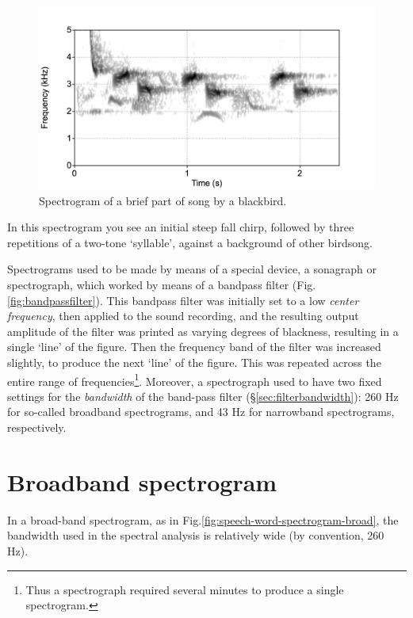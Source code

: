 \documentclass[
]{book}
\begin{document}
\begin{figure}

{\centering \includegraphics{figures/merel-spectrogram} 

}

\caption{Spectrogram of a brief part of song by a blackbird.}\label{fig:merel-spectrogram}
\end{figure}

In this spectrogram you see an initial steep fall chirp, followed by three repetitions of a two-tone `syllable', against a background of other birdsong.

Spectrograms used to be made by means of a special device, a sonagraph or spectrograph, which worked by means of a bandpass filter (Fig.\ref{fig:bandpassfilter}). This bandpass filter was initially set to a low \emph{center frequency}, then applied to the sound recording, and the resulting output amplitude of the filter was printed as varying degrees of blackness, resulting in a single `line' of the figure. Then the frequency band of the filter was increased slightly, to produce the next `line' of the figure. This was repeated across the entire range of frequencies\footnote{Thus a spectrograph required several minutes to produce a single spectrogram.}. Moreover, a spectrograph used to have two fixed settings for the \emph{bandwidth} of the band-pass filter (§\ref{sec:filterbandwidth}): 260 Hz for so-called broadband spectrograms, and 43 Hz for narrowband spectrograms, respectively.

\section{Broadband spectrogram}\label{broadband-spectrogram}

In a broad-band spectrogram, as in Fig.\ref{fig:speech-word-spectrogram-broad}, the bandwidth used in the spectral analysis is relatively wide (by convention, 260 Hz).
\end{document}
